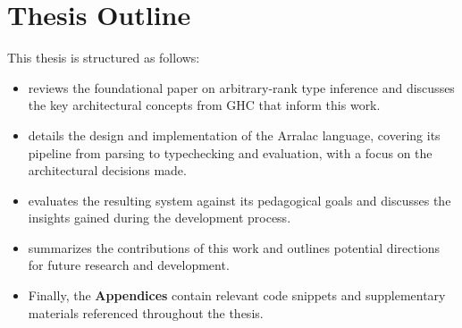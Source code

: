\section{Thesis Outline}

This thesis is structured as follows:

\begin{itemize}
    \item \textbf{} reviews the foundational paper on arbitrary-rank type inference and discusses the key architectural concepts from GHC that inform this work.
    \item \textbf{} details the design and implementation of the Arralac language, covering its pipeline from parsing to typechecking and evaluation, with a focus on the architectural decisions made.
    \item \textbf{} evaluates the resulting system against its pedagogical goals and discusses the insights gained during the development process.
    \item \textbf{} summarizes the contributions of this work and outlines potential directions for future research and development.
    \item Finally, the \textbf{Appendices} contain relevant code snippets and supplementary materials referenced throughout the thesis.
\end{itemize}